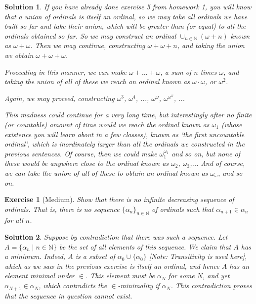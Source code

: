 \documentclass{article}
\newtheorem{ex}{Exercise}
\theoremstyle{nonumberplain}
\newtheorem{sol}{Solution}
\newcommand{\N}{\mathbb{N}}
\begin{document}
\begin{sol}
If you have already done exercise 5 from homework 1, you will know that a union of ordinals is itself an ordinal, so we may take all ordinals we have built so far and take their union, which will be greater than (or equal) to all the ordinals obtained so far. So we may construct an ordinal $\cup_{n \in \N} (\omega + n)$ known as $\omega + \omega$. Then we may continue, constructing $\omega+\omega+n$, and taking the union we obtain $\omega+\omega+\omega$.

Proceeding in this manner, we can make $\omega + \dots + \omega$, a sum of $n$ times $\omega$, and taking the union of all of these we reach an ordinal known as $\omega \cdot \omega$, or $\omega^2$.

Again, we may proceed, constructing $\omega^3$, $\omega^4$, ..., $\omega^\omega$, $\omega^{\omega^\omega}$, ...

This madness could continue for a very long time, but interestingly after no finite (or countable) amount of time would we reach the ordinal known as $\omega_1$ (whose existence you will learn about in a few classes), known as `the first uncountable ordinal', which is inordinately larger than all the ordinals we constructed in the previous sentences. Of course, then we could make $\omega_1^{\omega_1}$ and so on, but none of these would be anywhere close to the ordinal known as $\omega_2$, $\omega_3$,... And of course, we can take the union of all of these to obtain an ordinal known as $\omega_\omega$, and so on.
\end{sol}

\begin{ex}[Medium]
Show that there is no infinite decreasing sequence of ordinals. That is, there is no sequence $\{\alpha_n\}_{n \in \N}$ of ordinals such that $\alpha_{n+1} \in \alpha_n$ for all $n$.
\end{ex}

\begin{sol}
Suppose by contradiction that there was such a sequence. Let $A = \{ \alpha_n \mid n \in \N\}$ be the set of all elements of this sequence. We claim that $A$ has a minimum. Indeed, $A$ is a subset of $\alpha_0 \cup \{\alpha_0\}$ [Note: Transitivity is used here], which as we saw in the previous exercise is itself an ordinal, and hence $A$ has an element minimal under $\in$. This element must be $\alpha_N$ for some $N$, and yet $\alpha_{N+1} \in \alpha_N$, which contradicts the $\in$-minimality if $\alpha_N$. This contradiction proves that the sequence in question cannot exist.
\end{sol}
\end{document}
